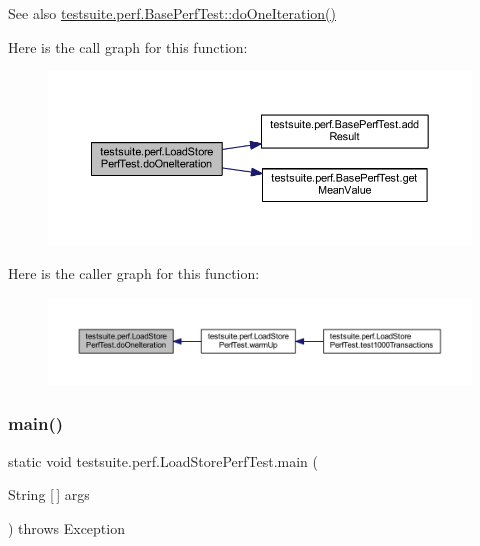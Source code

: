 \begin{DoxySeeAlso}{See also}
\mbox{\hyperlink{classtestsuite_1_1perf_1_1_base_perf_test_ac9682520790f17d153ad993c7bdf5bf4}{testsuite.\+perf.\+Base\+Perf\+Test\+::do\+One\+Iteration()}} 
\end{DoxySeeAlso}
Here is the call graph for this function\+:
\nopagebreak
\begin{figure}[H]
\begin{center}
\leavevmode
\includegraphics[width=350pt]{classtestsuite_1_1perf_1_1_load_store_perf_test_aae53536cc1145eb4860cc71c132f66d8_cgraph}
\end{center}
\end{figure}
Here is the caller graph for this function\+:
\nopagebreak
\begin{figure}[H]
\begin{center}
\leavevmode
\includegraphics[width=350pt]{classtestsuite_1_1perf_1_1_load_store_perf_test_aae53536cc1145eb4860cc71c132f66d8_icgraph}
\end{center}
\end{figure}
\mbox{\label{classtestsuite_1_1perf_1_1_load_store_perf_test_ab6e6a7c9d6a4facf8b8df79d201d8837}} 
\subsubsection{\texorpdfstring{main()}{main()}}
{\footnotesize\ttfamily static void testsuite.\+perf.\+Load\+Store\+Perf\+Test.\+main (\begin{DoxyParamCaption}\item[{String \mbox{[}$\,$\mbox{]}}]{args }\end{DoxyParamCaption}) throws Exception\hspace{0.3cm}{\ttfamily [static]}}

